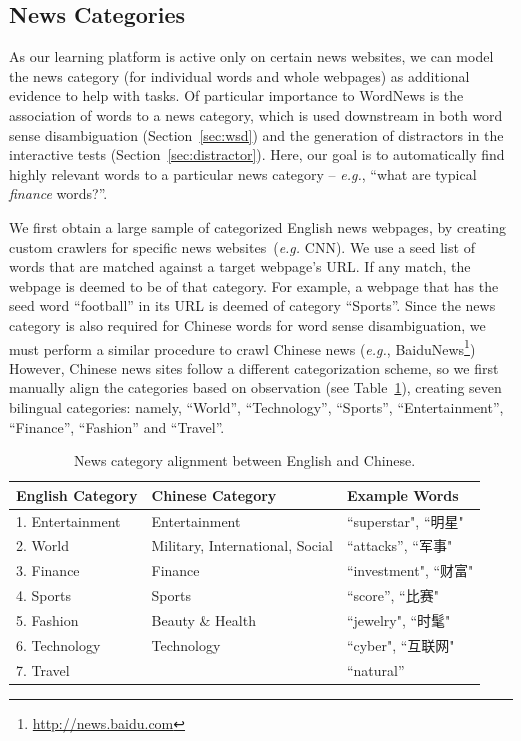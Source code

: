 \begin{CJK}{UTF8}{gbsn}
\subsection{News Categories}
\label{subsec:category}
As our learning platform is active only on certain news websites, we
can model the news category (for individual words and whole webpages)
as additional evidence to help with tasks.  Of particular importance
to WordNews is the association of words to a news category, which is
used downstream in both word sense disambiguation
(Section~\ref{sec:wsd}) and the generation of distractors in the
interactive tests (Section~\ref{sec:distractor}).  Here, our goal is
to automatically find highly relevant words to a particular news
category -- {\it e.g.}, ``what are typical {\it finance} words?''.

We first obtain a large sample of categorized English news webpages,
by creating custom crawlers for specific news websites~({\it e.g.}
CNN).  We use a seed list of words that are matched against a target
webpage's URL.  If any match, the webpage is deemed to be of that
category.  For example, a webpage that has the seed word ``football''
in its URL is deemed of category ``Sports''.  Since the news category
is also required for Chinese words for word sense disambiguation, we
must perform a similar procedure to crawl Chinese news ({\it e.g.},
BaiduNews\footnote{\url{http://news.baidu.com}}) However, Chinese news
sites follow a different categorization scheme, so we first manually
align the categories based on observation (see Table~\ref{table:cat}),
creating seven bilingual categories: namely, ``World'',
``Technology'', ``Sports'', ``Entertainment'', ``Finance'',
``Fashion'' and ``Travel''.

\begin{table}[t]
\centering
  \caption{News category alignment between English and Chinese.}
  \label{table:cat}
  \begin{tabular}{| p{2.4cm} | p{2.2cm} | p{1.9cm} |}
    \hline
    {\bf English \qquad Category} & {\bf Chinese \qquad Category} & {\bf Example Words}\\
    \hline
    1. Entertainment & Entertainment & ``superstar", ``明星"\\
    \hline
    2. World &  Military, \qquad International, Social & ``attacks'', ``军事"  \\
    \hline
    3. Finance & Finance & ``investment", ``财富"\\
    \hline
    4. Sports & Sports & ``score'', ``比赛" \\
    \hline
    5. Fashion &  Beauty \& Health & ``jewelry", ``时髦"\\
    \hline
    6. Technology & Technology  & ``cyber", ``互联网"\\ \hline
    7. Travel  &  & ``natural'' \\
    \hline
  \end{tabular}
\end{table}


\end{CJK}
